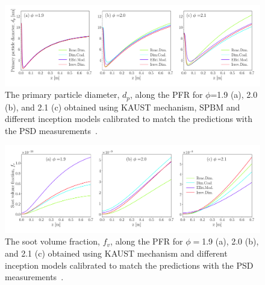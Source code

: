 \begin{figure}[H]
	\centering
	\includegraphics[width=1\textwidth]{Figures/Results/PSR/d_p_eq_ratio_all_single_mech.pdf}
	\caption{The primary particle diameter, $d_p$, along the PFR for $\phi$=1.9 (a), 2.0 (b), and 2.1 (c) obtained using KAUST mechanism, SPBM and different inception models calibrated to match the predictions with the PSD measurements~\citep{manzello2007soot}.}
	\label{fig:psrpfr_dp} 
\end{figure}

\begin{figure}[H]
	\centering
	\includegraphics[width=1\textwidth]{Figures/Results/PSR/f_v_eq_ratio_all_single_mech.pdf}
	\caption{The soot volume fraction, $f_v$, along the PFR for $\phi=$1.9 (a), 2.0 (b), and 2.1 (c) obtained using KAUST mechanism and different inception models calibrated to match the predictions with the PSD measurements~\citep{manzello2007soot}.}
	\label{fig:psrpfr_fv} 
\end{figure}



